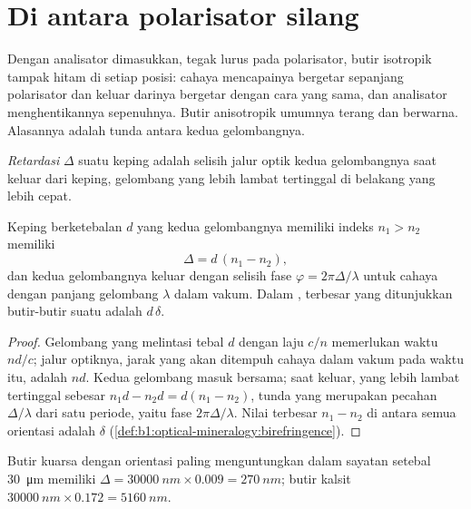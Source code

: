 \section{Di antara polarisator silang}

Dengan analisator dimasukkan, tegak lurus pada polarisator, butir isotropik tampak hitam di setiap posisi: cahaya mencapainya bergetar sepanjang polarisator dan keluar darinya bergetar dengan cara yang sama, dan analisator menghentikannya sepenuhnya. Butir anisotropik umumnya terang dan berwarna. Alasannya adalah tunda antara kedua gelombangnya.

\begin{definition}\label{def:b1:optical-mineralogy:retardation}
\emph{Retardasi} $\Delta$ suatu keping  adalah selisih jalur optik kedua gelombangnya saat keluar dari keping, gelombang yang lebih lambat tertinggal di belakang yang lebih cepat.
\end{definition}

\begin{proposition}\label{prop:b1:optical-mineralogy:retardation}
Keping berketebalan $d$ yang kedua gelombangnya memiliki indeks $n_1 > n_2$ memiliki 
\[
  \Delta = d\,(n_1 - n_2),
\]
dan kedua gelombangnya keluar dengan selisih fase $\varphi = 2\pi\Delta/\lambda$ untuk cahaya dengan panjang gelombang $\lambda$ dalam vakum. Dalam ,  terbesar yang ditunjukkan butir-butir suatu  adalah $d\,\delta$.
\end{proposition}

\begin{proof}
Gelombang yang melintasi tebal $d$ dengan laju $c/n$ memerlukan waktu $nd/c$; jalur optiknya, jarak yang akan ditempuh cahaya dalam vakum pada waktu itu, adalah $nd$. Kedua gelombang masuk bersama; saat keluar, yang lebih lambat tertinggal sebesar $n_1 d - n_2 d = d(n_1 - n_2)$, tunda yang merupakan pecahan $\Delta/\lambda$ dari satu periode, yaitu fase $2\pi\Delta/\lambda$. Nilai terbesar $n_1 - n_2$ di antara semua orientasi adalah $\delta$
(\cref{def:b1:optical-mineralogy:birefringence}).
\end{proof}

Butir kuarsa dengan orientasi paling menguntungkan dalam sayatan setebal \qty{30}{\micro m} memiliki $\Delta = \qty{30000}{nm}\times0.009 =
\qty{270}{nm}$; butir kalsit $\qty{30000}{nm}\times0.172 = \qty{5160}{nm}$.

